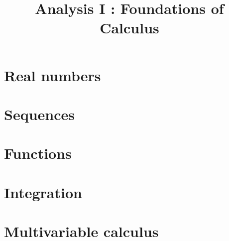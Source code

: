 \documentclass{../crs}
\title{Analysis I : Foundations of Calculus}
\begin{document}
\maketitle
\tableofcontents

\chapter{Real numbers}


\chapter{Sequences}


\chapter{Functions}


\chapter{Integration}


\chapter{Multivariable calculus}
\end{document}

